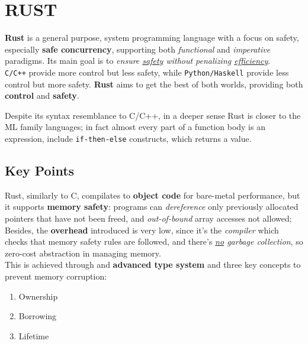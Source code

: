\chapter{RUST}
\textbf{Rust} is a general purpose, system programming language
with a focus on safety, especially \textbf{safe concurrency},
supporting both \textit{functional} and \textit{imperative} paradigms.
Its main goal is to \textit{ensure \underline{safety} without penalizing \underline{efficiency}}.\\
\texttt{C/C++} provide more control but less safety, while \texttt{Python/Haskell} provide less control but more safety.
\textbf{Rust} aims to get the best of both worlds, providing both \textbf{control} and \textbf{safety}.

Despite its syntax resemblance to C/C++, in a deeper sense Rust is closer to the ML family languages;
in fact almost every part of a function body is an expression, include \texttt{if-then-else} constructs, which returns a value.

\section{Key Points}
Rust, similarly to C, compilates to \textbf{object code} for bare-metal performance,
but it supports \textbf{memory safety}:
programs can \textit{dereference} only previously allocated pointers that have
not been freed, and \textit{out-of-bound} array accesses not allowed;
Besides, the \textbf{overhead} introduced is very low, since it's the \textit{compiler} which checks that memory safety rules are followed,
and there's \textit{\underline{no} garbage collection}, so zero-cost abstraction in managing memory.\\
This is achieved through and \textbf{advanced type system} and three key concepts to prevent memory corruption:
\begin{enumerate}
   \item Ownership
   \item Borrowing
   \item Lifetime
\end{enumerate}

